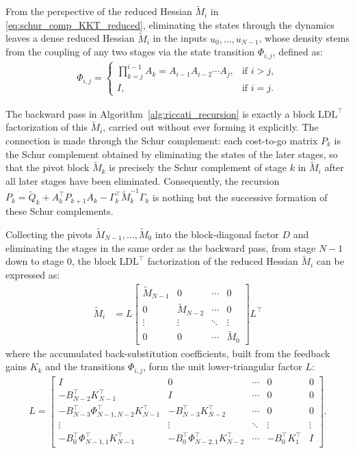 \documentclass[class=scrbook, crop=false]{standalone}
\begin{document}
From the perspective of the reduced Hessian $\tilde{M}_i$ in \eqref{eq:schur_comp_KKT_reduced}, 
eliminating the states through the dynamics leaves a dense reduced Hessian $\tilde{M}_i$ in the inputs $u_0, \dots, u_{N-1}$, 
whose density stems from the coupling of any two stages via the state transition $\Phi_{i, j}$, defined as:
\begin{align*}
    \Phi_{i, j} = \begin{cases}
    \prod_{k=j}^{i-1} A_k = A_{i-1} A_{i-2} \cdots A_j, & \text{if } i > j, \\
    I, & \text{if } i = j.
    \end{cases}
\end{align*}

The backward pass in Algorithm~\ref{alg:riccati_recursion} is exactly a block $\mathrm{LD}\mathrm{L}^\top$ factorization of this $\tilde{M}_i$, 
carried out without ever forming it explicitly. The connection is made through the Schur complement: 
each cost-to-go matrix $P_k$ is the Schur complement obtained by eliminating the states of the later stages, 
so that the pivot block $\tilde{M}_k$ is precisely the Schur complement of stage $k$ in $\tilde{M}_i$ after all later stages have been eliminated. 
Consequently, the recursion $P_k = \tilde{Q}_k + A_k^\top P_{k+1} A_k - \Gamma_k^\top \tilde{M}_k^{-1} \Gamma_k$ is nothing but the successive formation of these Schur complements.

Collecting the pivots $\tilde{M}_{N-1}, \dots, \tilde{M}_0$ into the block-diagonal factor $D$ and eliminating the stages in the same order as the backward pass, 
from stage $N-1$ down to stage $0$, the block $\mathrm{LD}\mathrm{L}^\top$ factorization of the reduced Hessian $\tilde{M}_i$ can be expressed as:
\begin{align*}
    \tilde{M}_i &= L
    \begin{bmatrix}
    \tilde{M}_{N-1} & 0 & \cdots & 0 \\
    0 & \tilde{M}_{N-2} & \cdots & 0 \\
    \vdots & \vdots & \ddots & \vdots \\
    0 & 0 & \cdots & \tilde{M}_{0}
    \end{bmatrix}
    L^\top
\end{align*}
where the accumulated back-substitution coefficients, built from the feedback gains $K_k$ and the transitions $\Phi_{i, j}$, form the unit lower-triangular factor $L$:
\begin{align*}
    L = 
    \begin{bmatrix}
    I & 0 & \cdots & 0 & 0 \\
    -B_{N-2}^\top K_{N-1}^\top & I & \cdots & 0 & 0 \\
    -B_{N-3}^\top \Phi_{N-1, N-2}^\top K_{N-1}^\top & -B_{N-3}^\top K_{N-2}^\top & \cdots & 0 & 0 \\
    \vdots & \vdots & \ddots & \vdots & \vdots \\
    -B_0^\top \Phi_{N-1, 1}^\top K_{N-1}^\top & -B_0^\top \Phi_{N-2, 1}^\top K_{N-2}^\top & \cdots & -B_0^\top K_1^\top & I
    \end{bmatrix}.
\end{align*}
\end{document}
